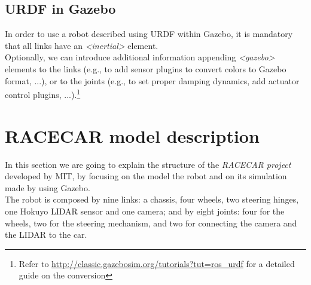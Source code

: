 \subsection{URDF in Gazebo}
In order to use a robot described using URDF within Gazebo, it is mandatory that all links have an \textit{<inertial>} element. \\
Optionally, we can introduce additional information appending \textit{<gazebo>} elements to the links (e.g., to add sensor plugins
to convert colors to Gazebo format, ...), or to the joints (e.g., to set proper damping dynamics, add actuator control plugins, 
...).\footnote{Refer to \url{http://classic.gazebosim.org/tutorials?tut=ros_urdf} for a detailed guide on the conversion}


\section{RACECAR model description}
In this section we are going to explain the structure of the \textit{RACECAR project} developed by MIT, by focusing on 
the model the robot and on its simulation made by using Gazebo. \\
The robot is composed by nine links: a chassis, four wheels, two steering hinges, one Hokuyo LIDAR sensor and one camera;
and by eight joints: four for the wheels, two for the steering mechanism, and two for connecting the camera and the 
LIDAR to the car.\\

